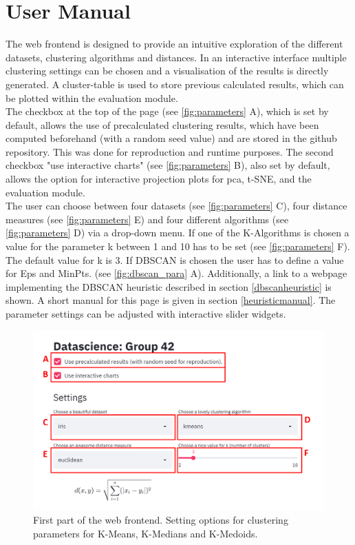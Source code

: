 \documentclass[12pt, english]{article}
\begin{document}
\section*{User Manual}
The web frontend is designed to provide an intuitive exploration of the different datasets, clustering algorithms and distances. In an interactive interface multiple clustering settings can be chosen and a visualisation of the results is directly generated. 
A cluster-table is used to store previous calculated results, which can be plotted within the evaluation module. \\
The checkbox  at the top of the page (see \autoref{fig:parameters} A), which is set by default, allows the use of precalculated clustering results, which have been computed beforehand (with a random seed value) and are stored in the github repository. This was done for reproduction and runtime purposes. The second checkbox "use interactive charts" (see \autoref{fig:parameters} B), also set by default, allows the option for interactive projection plots for pca, t-SNE, and the evaluation module.  \\
The user can choose between four datasets (see \autoref{fig:parameters} C), four distance measures (see \autoref{fig:parameters} E) and four different algorithms (see \autoref{fig:parameters} D) via a drop-down menu. If one of the K-Algorithms is chosen a value for the parameter k between 1 and 10 has to be set (see \autoref{fig:parameters} F). The default value for k is 3. If DBSCAN is chosen the user has to define a value for Eps and MinPts. (see \autoref{fig:dbscan_para} A). Additionally, a link to a webpage implementing the DBSCAN heuristic described in section \ref{dbscanheuristic} is shown. A short manual for this page is given in section \ref{heuristicmanual}. The parameter settings can be adjusted with interactive slider widgets. \\
\begin{figure}[H]
	\centering
	\includegraphics[width=\linewidth]{modules/web_frontend/eingabe_letters}
	\caption{First part of the web frontend. Setting options for clustering parameters for K-Means, K-Medians and K-Medoids.}\label{fig:parameters}
\end{figure}
\end{document}
